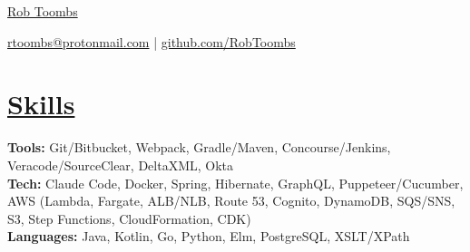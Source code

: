 \documentclass[10pt,letterpaper]{article}
\begin{document}

\centerline{\Huge \href{https://www.reddit.com/r/EngineeringResumes/wiki/index}{Rob Toombs}}

\vspace{5pt}


\centerline{\href{https://www.reddit.com/r/EngineeringResumes/wiki/index\#wiki_contact_information}{rtoombs@protonmail.com} | \href{https://www.reddit.com/r/EngineeringResumes/wiki/index\#wiki_portfolios}{github.com/RobToombs}}

\vspace{-10pt}


\section*{\href{https://www.reddit.com/r/EngineeringResumes/wiki/index\#wiki_skills}{Skills}}
\textbf{Tools:} Git/Bitbucket, Webpack, Gradle/Maven, Concourse/Jenkins, Veracode/SourceClear, DeltaXML, Okta \\
\textbf{Tech:} Claude Code, Docker, Spring, Hibernate, GraphQL, Puppeteer/Cucumber, AWS (Lambda, Fargate, ALB/NLB, Route 53, Cognito, DynamoDB, SQS/SNS, S3, Step Functions, CloudFormation, CDK)  \\
\textbf{Languages:} Java, Kotlin, Go, Python, Elm, PostgreSQL, XSLT/XPath

\vspace{-6.5pt}

\end{document}
